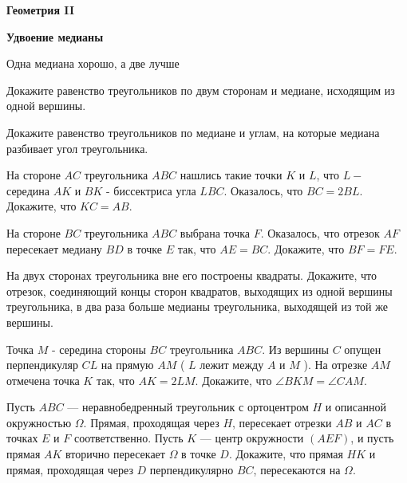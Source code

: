 \centerline{\bf \Huge Геометрия II}
\centerline{\bf \Huge Удвоение медианы}

\begin{flushright}
        \scriptsize{Одна медиана хорошо, а две лучше}
\end{flushright}

Докажите равенство треугольников по двум сторонам и медиане, исходящим из одной вершины.

Докажите равенство треугольников по медиане и углам, на которые медиана разбивает угол треугольника.

На стороне $A C$ треугольника $A B C$ нашлись такие точки $K$ и $L$, что $L-$ середина $A K$ и $B K$ - биссектриса угла $L B C$. Оказалось, что $B C=2 B L$. Докажите, что $K C=A B$.

На стороне $B C$ треугольника $A B C$ выбрана точка $F$. Оказалось, что отрезок $A F$ пересекает медиану $B D$ в точке $E$ так, что $A E=B C$. Докажите, что $B F=F E$.

На двух сторонах треугольника вне его построены квадраты. Докажите, что отрезок, соединяющий концы сторон квадратов, выходящих из одной вершины треугольника, в два раза больше медианы треугольника, выходящей из той же вершины.

Точка $M$ - середина стороны $B C$ треугольника $A B C$. Из вершины $C$ опущен перпендикуляр $C L$ на прямую $A M$ ( $L$ лежит между $A$ и $M$ ). На отрезке $A M$ отмечена точка $K$ так, что $A K=2 L M$. Докажите, что $\angle B K M=\angle C A M$.

 Пусть $ABC$ --- неравнобедренный треугольник с ортоцентром $H$ и описанной окружностью $\Omega$. Прямая, проходящая через $H$, пересекает отрезки $AB$ и $AC$ в точках $E$ и $F$ соответственно. Пусть $K$ --- центр окружности $(AEF)$, и пусть прямая $AK$ вторично пересекает $\Omega$ в точке $D$. Докажите, что прямая $HK$ и прямая, проходящая через $D$ перпендикулярно $BC$, пересекаются на $\Omega$.

